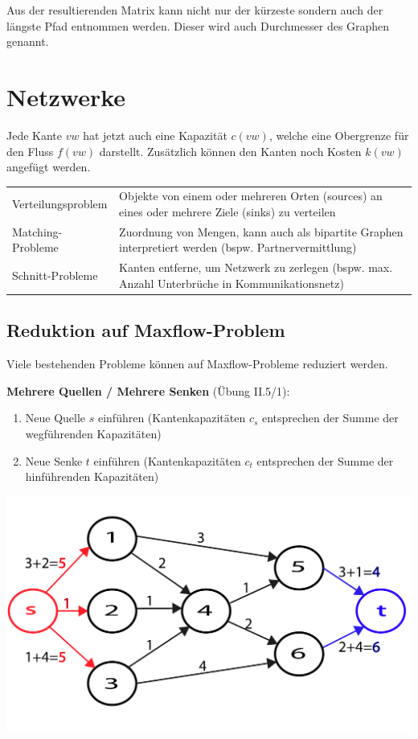 Aus der resultierenden Matrix kann nicht nur der kürzeste sondern auch der längste Pfad entnommen werden. Dieser wird auch Durchmesser des Graphen genannt.


%
%
\section{Netzwerke}
Jede Kante $vw$ hat jetzt auch eine Kapazität $c(vw)$, welche eine Obergrenze für den Fluss $f(vw)$ darstellt. Zusätzlich können den Kanten noch Kosten $k(vw)$ angefügt werden.
  
  \begin{tabularx}{\textwidth}{l X}
    Verteilungsproblem
      & Objekte von einem oder mehreren Orten (sources) an eines oder mehrere Ziele (sinks) zu verteilen\\
    Matching-Probleme
      & Zuordnung von Mengen, kann auch als bipartite Graphen interpretiert werden (bspw. Partnervermittlung) \\
    Schnitt-Probleme
      & Kanten entferne, um Netzwerk zu zerlegen (bspw. max. Anzahl Unterbrüche in Kommunikationsnetz)\\
  \end{tabularx}

\subsection{Reduktion auf Maxflow-Problem}

Viele bestehenden Probleme können auf Maxflow-Probleme reduziert werden.
 

\begin{minipage}{0.6\textwidth}
\textbf{Mehrere Quellen / Mehrere Senken} (Übung II.5/1):\\
	\begin{enumerate}
		\itemsep-1mm
		\item Neue Quelle $s$ einführen (Kantenkapazitäten $c_s$ entsprechen der Summe der wegführenden Kapazitäten)
		\item Neue Senke $t$ einführen (Kantenkapazitäten $c_t$ entsprechen der Summe der hinführenden Kapazitäten)
	\end{enumerate}
\end{minipage}
\begin{minipage}{0.4\textwidth}
	\includegraphics[width=\textwidth]{Content/Graphen/MultiSrcSink.pdf}
\end{minipage}

